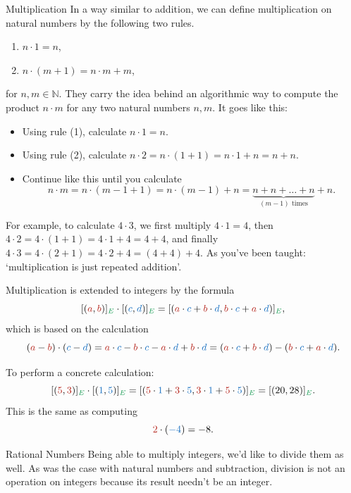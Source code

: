 \documentclass[final]{beamer}
\newlength{\colwidth}
\newcommand{\N}{\mathbb{N}}
\newcommand{\clr}{\textcolor{BrickRed}}
\newcommand{\clb}{\textcolor{RoyalBlue}}
\newcommand{\clg}{\textcolor{ForestGreen}}
\begin{document}
\begin{frame}[t]
\begin{columns}[t]
\begin{column}{\colwidth}
\begin{block}{Multiplication}
 In a way similar to addition, we can define \alert{multiplication} on natural
 numbers by the following two rules.
 \begin{enumerate}[label=(\arabic*),left=12pt]
  \item $n \cdot 1 = n$,
  \item $n \cdot (m + 1) = n \cdot m + m$,
 \end{enumerate}
 for $n,m \in \N$. They carry the idea behind an algorithmic way to compute the
 product $n \cdot m$ for any two natural numbers $n,m$. It goes like this:
 \begin{itemize}[left=12pt,label=\textbullet]
  \item Using rule (1), calculate $n \cdot 1 = n$.
  \item Using rule (2), calculate $n \cdot 2 = n \cdot (1 + 1) = n \cdot 1 + n =
   n + n$.
  \item Continue like this until you calculate
   \[
    n \cdot m = n \cdot (m - 1 + 1) = n \cdot (m - 1) + n = \underbrace{n + n +
    \ldots + n}_{(m - 1)\text{ times}} + n.
   \]
 \end{itemize}
 For example, to calculate $4 \cdot 3$, we first multiply $4 \cdot 1 = 4$, then
 $4 \cdot 2 = 4 \cdot (1 + 1) = 4 \cdot 1 + 4 = 4 + 4$, and finally $4 \cdot 3 =
 4 \cdot (2 + 1) = 4 \cdot 2 + 4 = (4 + 4) + 4$. As you've been taught:
 `\alert{multiplication is just repeated addition}'.

 Multiplication is extended to integers by the formula
 \[
  [(\clr{a},\clr{b})]_{\clg{E}} \cdot [(\clb{c},\clb{d})]_{\clg{E}} = [(\clr{a}
  \cdot \clb{c} + \clr{b} \cdot \clb{d}, \clr{b} \cdot \clb{c} + \clr{a} \cdot
  \clb{d})]_{\clg{E}},
 \]
 which is based on the calculation
 \[
  (\clr{a} - \clr{b}) \cdot (\clb{c} - \clb{d}) = \clr{a} \cdot \clb{c} -
  \clr{b} \cdot \clb{c} - \clr{a} \cdot \clb{d} + \clr{b} \cdot \clb{d} =
  (\clr{a} \cdot \clb{c} + \clr{b} \cdot \clb{d}) - (\clr{b} \cdot \clb{c} +
  \clr{a} \cdot \clb{d}).
 \]
 
 To perform a concrete calculation:
 \[
  [(\clr{5},\clr{3})]_{\clg{E}} \cdot [(\clb{1},\clb{5})]_{\clg{E}} =
  [(\clr{5} \cdot \clb{1} + \clr{3} \cdot \clb{5}, \clr{3} \cdot \clb{1} +
  \clr{5} \cdot \clb{5})]_{\clg{E}} = [(20, 28)]_{\clg{E}}.
 \]
 This is the same as computing
 \[
  \clr{2} \cdot (\clb{-4}) = -8.
 \]
\end{block}

\begin{exampleblock}{Rational Numbers}
 Being able to \alert{multiply integers}, we'd like to divide them as well. As
 was the case with natural numbers and subtraction, \alert{division is not an
 operation on integers} because its result needn't be an integer.


\end{exampleblock}
\end{column}
\end{columns}
\end{frame}
\end{document}
